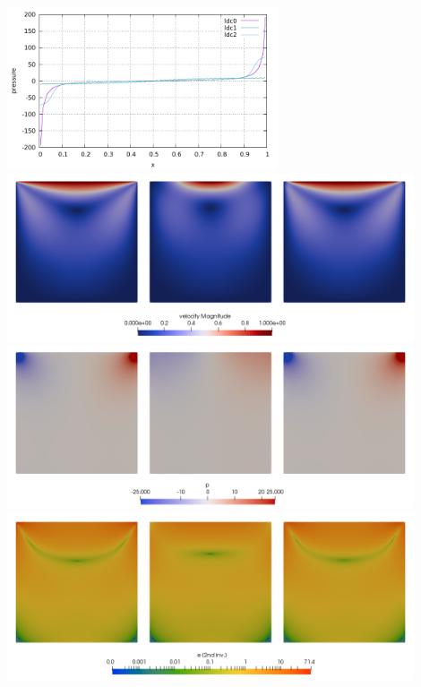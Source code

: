 \begin{center}
\includegraphics[width=8cm]{python_codes/fieldstone_04/results/p.pdf}\\
\includegraphics[width=12cm]{python_codes/fieldstone_04/results/velocities}\\
\includegraphics[width=12cm]{python_codes/fieldstone_04/results/pressures}\\
\includegraphics[width=12cm]{python_codes/fieldstone_04/results/strainrates}
\end{center}


